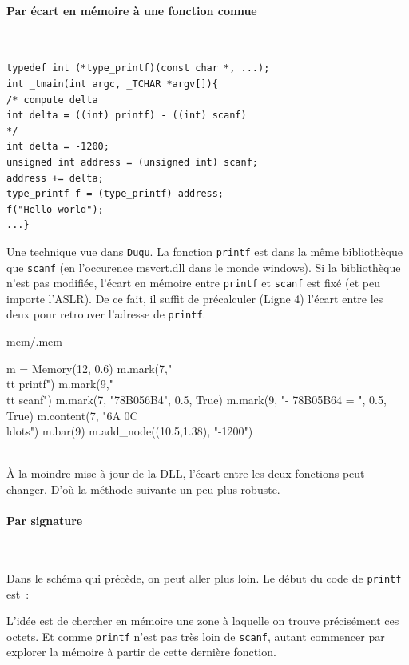 \documentclass{book}
\newcounter{Qcours}
\newenvironment{memory}{%
	\noindent
	\VerbatimEnvironment\stepcounter{Qcours}%
	\begin{VerbatimOut}{mem/\theQcours.mem}%
	}{\end{VerbatimOut}%
}
\newenvironment{commentaire}[1]{%
	\def\FrameCommand{\fboxrule=\FrameRule\fboxsep=\FrameSep \fcolorbox{yellow!50}{yellow!10}}%
	\MakeFramed {\advance\hsize-\width \FrameRestore}
	\noindent {\bf #1}\\
}%
{\endMakeFramed}
\newcommand{\code}[1]{\texttt{#1}}
\begin{document}
\paragraph{Par écart en mémoire à une fonction connue}{~}

\begin{verbatim}
typedef int (*type_printf)(const char *, ...);
int _tmain(int argc, _TCHAR *argv[]){
/* compute delta 
int delta = ((int) printf) - ((int) scanf)
*/
int delta = -1200;
unsigned int address = (unsigned int) scanf;
address += delta;
type_printf f = (type_printf) address;
f("Hello world");
...}
\end{verbatim}

Une technique vue dans {\tt Duqu}. La fonction \code{printf} est dans la même bibliothèque que \code{scanf} (en l'occurence {\sc msvcrt.dll} dans le monde {\sc windows}). Si la bibliothèque n'est pas modifiée, l'écart en mémoire entre \code{printf} et \code{scanf} est fixé (et peu importe l'ASLR). De ce fait, il suffit de précalculer (Ligne 4) l'écart entre les deux pour retrouver l'adresse de \code{printf}. 

\bigskip

\begin{memory}
m = Memory(12, 0.6)
m.mark(7,"\\tt printf")
m.mark(9,"\\tt scanf")
m.mark(7, "78B056B4", 0.5, True)
m.mark(9, "- 78B05B64 = ", 0.5, True)
m.content(7, "6A 0C \\ldots")
m.bar(9)
m.add_node((10.5,1.38), "-1200")
\end{memory}





\begin{commentaire}{Fragilités}
\`A la moindre mise à jour de la DLL, l'écart entre les deux fonctions peut changer. D'où la méthode suivante un peu plus robuste. 	
\end{commentaire}

\paragraph{Par signature}{~}

Dans le schéma qui précède, on peut aller plus loin. Le début du code de \code{printf} est~: 

L'idée est de chercher en mémoire une zone à laquelle on trouve précisément ces octets. Et comme \code{printf} n'est pas très loin de \code{scanf}, autant commencer par explorer la mémoire à partir de cette dernière fonction. 
\end{document}
